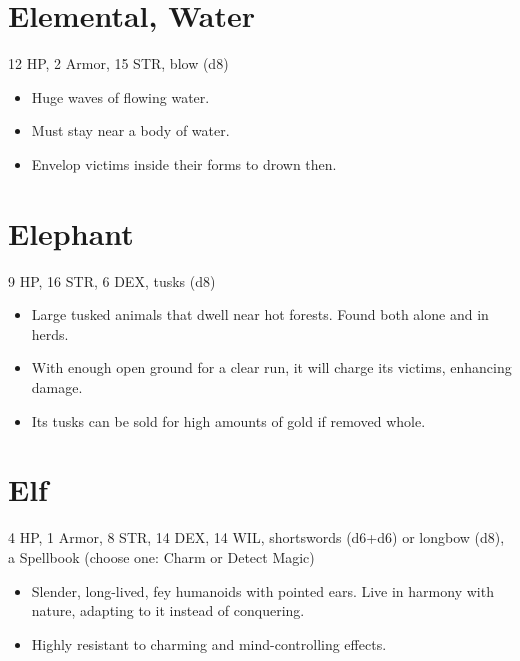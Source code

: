 \documentclass[
  10pt,
  american,
]{article}
\begin{document}
\hypertarget{elemental-water}{%
\section{Elemental, Water}\label{elemental-water}}

12 HP, 2 Armor, 15 STR, blow (d8)

\begin{samepage}
\begin{itemize}
\setlength\itemsep{-.5em}
\item Huge waves of flowing water.
\item Must stay near a body of water.
\item Envelop victims inside their forms to drown then.
\end{itemize}
\end{samepage}

\hypertarget{elephant}{%
\section{Elephant}\label{elephant}}

9 HP, 16 STR, 6 DEX, tusks (d8)

\begin{samepage}
\begin{itemize}
\setlength\itemsep{-.5em}
\item Large tusked animals that dwell near hot forests.   Found both alone and in herds.
\item With enough open ground for a clear run, it will charge its victims, enhancing damage.
\item Its tusks can be sold for high amounts of gold if removed whole.
\end{itemize}
\end{samepage}

\hypertarget{elf}{%
\section{Elf}\label{elf}}

4 HP, 1 Armor, 8 STR, 14 DEX, 14 WIL, shortswords (d6+d6) or longbow
(d8), a Spellbook (choose one: Charm or Detect Magic)

\begin{samepage}
\begin{itemize}
\setlength\itemsep{-.5em}
\item Slender, long-lived, fey humanoids with pointed ears. Live in harmony with nature, adapting to it instead of conquering.
\item Highly resistant to charming and mind-controlling effects.
\end{itemize}
\end{samepage}
\end{document}
